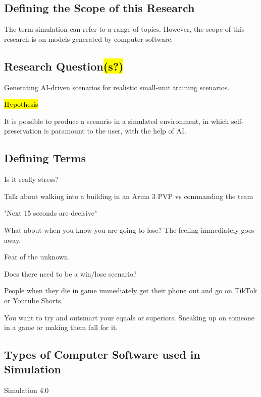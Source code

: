 \documentclass{article}
\begin{document}
\subsection{Defining the Scope of this Research}

The term simulation can refer to a range of topics. However, the scope of this research is on models generated by computer software.

\subsection{Research Question\hl{(s?)}}

Generating AI-driven scenarios for realistic small-unit training scenarios. 

\hl{Hypothesis}

It is possible to produce a scenario in a simulated environment, in which self-preservation is paramount to the user, with the help of AI.


\subsection{Defining Terms}


Is it really stress?

Talk about walking into a building in an Arma 3 PVP vs commanding the team

"Next 15 seconds are decisive"

What about when you know you are going to lose? The feeling immediately goes away. 

Fear of the unknown.

Does there need to be a win/lose scenario? 

People when they die in game immediately get their phone out and go on TikTok or Youtube Shorts.

You want to try and outsmart your equals or superiors. Sneaking up on someone in a game or making them fall for it.

\subsection{Types of Computer Software used in Simulation}

Simulation 4.0 \cite{DEPAULAFERREIRA2020106868}
\end{document}
